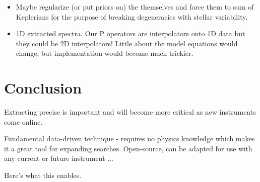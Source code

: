 \documentclass[modern]{aastex62}
\begin{document}
\begin{itemize}
\item Maybe regularize (or put priors on) the \RVs themselves and force them to sum of Keplerians for the purpose of breaking degeneracies with stellar variability.

\item 1D extracted spectra. Our P operators are interpolators onto 1D data but they could be 2D interpolators! Little about the model equations would change, but implementation would become much trickier.


\end{itemize}

\section{Conclusion}
\label{s:conclusion}

Extracting precise \RVs is important and will become more critical as new instruments come online. 

Fundamental data-driven technique - requires no physics knowledge which makes it a great tool for expanding \RV searches.  
Open-source, can be adapted for use with any current or future \EPRV instrument
...

Here's what this enables. 



\end{document}
